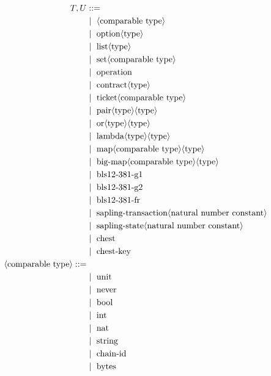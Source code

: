 \documentclass[runningheads]{llncs}
\begin{document}
\begin{figure} []
\begin{align*}
T, U &::= \\
   &\Mid\ \langle \text{comparable type}\rangle \\
   &\Mid\ \text{option} \langle\text{type}\rangle \\
   &\Mid\ \text{list} \langle\text{type}\rangle \\
   &\Mid\ \text{set} \langle\text{comparable type}\rangle \\
   &\Mid\ \text{operation} \\
   &\Mid\ \text{contract} \langle\text{type}\rangle \\
   &\Mid\ \text{ticket} \langle\text{comparable type}\rangle \\
   &\Mid\ \text{pair} \langle\text{type}\rangle \langle\text{type}\rangle \\
   &\Mid\ \text{or} \langle\text{type}\rangle \langle\text{type}\rangle \\
   &\Mid\ \text{lambda} \langle\text{type}\rangle \langle\text{type}\rangle \\
   &\Mid\ \text{map} \langle\text{comparable type}\rangle \langle\text{type}\rangle \\
   &\Mid\ \text{big-map} \langle\text{comparable type}\rangle \langle\text{type}\rangle \\
   &\Mid\ \text{bls12-381-g1} \\
   &\Mid\ \text{bls12-381-g2} \\
   &\Mid\ \text{bls12-381-fr} \\
   &\Mid\ \text{sapling-transaction} \langle\text{natural number constant}\rangle \\
   &\Mid\ \text{sapling-state} \langle\text{natural number constant}\rangle \\
   &\Mid\ \text{chest} \\
   &\Mid\ \text{chest-key} \\
\langle\text{comparable type}\rangle ::= \\
   &\Mid\ \text{unit} \\
   &\Mid\ \text{never} \\
   &\Mid\ \text{bool} \\
   &\Mid\ \text{int}\\
   &\Mid\ \text{nat}\\
   &\Mid\ \text{string}\\
   &\Mid\ \text{chain-id}\\
   &\Mid\ \text{bytes}\\

\end{align*}
\end{figure}
\end{document}

